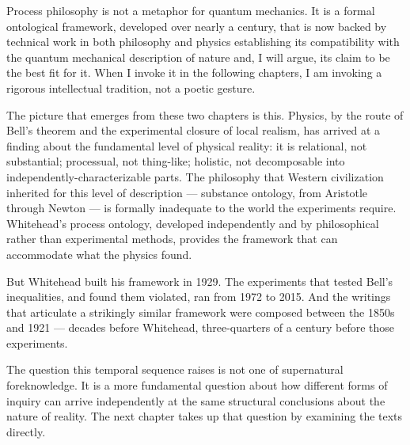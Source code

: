 Process philosophy is not a metaphor for quantum mechanics. It is a formal ontological framework, developed over nearly a century, that is now backed by technical work in both philosophy and physics establishing its compatibility with the quantum mechanical description of nature and, I will argue, its claim to be the best fit for it. When I invoke it in the following chapters, I am invoking a rigorous intellectual tradition, not a poetic gesture.


The picture that emerges from these two chapters is this. Physics, by the route of Bell's theorem and the experimental closure of local realism, has arrived at a finding about the fundamental level of physical reality: it is relational, not substantial; processual, not thing-like; holistic, not decomposable into independently-characterizable parts. The philosophy that Western civilization inherited for this level of description --- substance ontology, from Aristotle through Newton --- is formally inadequate to the world the experiments require. Whitehead's process ontology, developed independently and by philosophical rather than experimental methods, provides the framework that can accommodate what the physics found.

But Whitehead built his framework in 1929. The experiments that tested Bell's inequalities, and found them violated, ran from 1972 to 2015. And the \bahai writings that articulate a strikingly similar framework were composed between the 1850s and 1921 --- decades before Whitehead, three-quarters of a century before those experiments.

The question this temporal sequence raises is not one of supernatural foreknowledge. It is a more fundamental question about how different forms of inquiry can arrive independently at the same structural conclusions about the nature of reality. The next chapter takes up that question by examining the \bahai texts directly.

